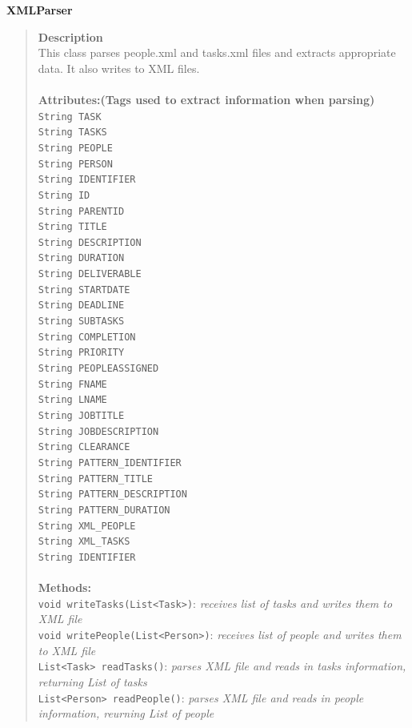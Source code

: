 \documentclass[12pt]{article}
\begin{document}
{\bf XMLParser}
\begin{quote}
{\bf Description}\\
This class parses people.xml and tasks.xml files and extracts appropriate data. It also writes to XML files.\\\\
{\bf Attributes:(Tags used to extract information when parsing)}\\
\texttt{String TASK}\\
\texttt{String TASKS}\\
\texttt{String PEOPLE}\\
\texttt{String PERSON}\\
\texttt{String IDENTIFIER}\\
\texttt{String ID}\\
\texttt{String PARENTID}\\
\texttt{String TITLE}\\
\texttt{String DESCRIPTION}\\
\texttt{String DURATION}\\
\texttt{String DELIVERABLE}\\
\texttt{String STARTDATE}\\
\texttt{String DEADLINE}\\
\texttt{String SUBTASKS}\\
\texttt{String COMPLETION}\\
\texttt{String PRIORITY}\\
\texttt{String PEOPLEASSIGNED}\\
\texttt{String FNAME}\\
\texttt{String LNAME}\\
\texttt{String JOBTITLE}\\
\texttt{String JOBDESCRIPTION}\\
\texttt{String CLEARANCE}\\
\texttt{String PATTERN\_IDENTIFIER}\\
\texttt{String PATTERN\_TITLE}\\
\texttt{String PATTERN\_DESCRIPTION}\\
\texttt{String PATTERN\_DURATION}\\
\texttt{String XML\_PEOPLE}\\
\texttt{String XML\_TASKS}\\
\texttt{String IDENTIFIER}\\\\
{\bf Methods:}\\
\texttt{void writeTasks(List<Task>)}: \emph{receives list of tasks and writes them to XML file}\\
\texttt{void writePeople(List<Person>)}: \emph{receives list of people and writes them to XML file}\\
\texttt{List<Task> readTasks()}: \emph{parses XML file and reads in tasks information, returning List of tasks}\\
\texttt{List<Person> readPeople()}: \emph{parses XML file and reads in people information, reurning List of people}
\end{quote}
 
\end{document}
